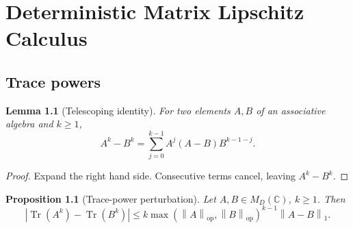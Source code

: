 \documentclass[11pt,oneside]{book}
\newtheorem{proposition}[theorem]{Proposition}
\newtheorem{lemma}[theorem]{Lemma}
\DeclareMathOperator{\Tr}{Tr}
\newcommand{\C}{\mathbb C}
\newcommand{\1}{\mathbf 1}
\newcommand{\op}{\mathrm{op}}
\newcommand{\norm}[1]{\left\|#1\right\|}
\begin{document}
\chapter{Deterministic Matrix Lipschitz Calculus}

\section{Trace powers}

\begin{lemma}[Telescoping identity]
For two elements \(A,B\) of an associative algebra and \(k\ge1\),
\[
  A^k-B^k=\sum_{j=0}^{k-1}A^j(A-B)B^{k-1-j}.
\]
\end{lemma}

\begin{proof}
Expand the right hand side.  Consecutive terms cancel, leaving \(A^k-B^k\).
\end{proof}

\begin{proposition}[Trace-power perturbation]
Let \(A,B\in M_D(\C)\), \(k\ge1\).  Then
\[
  |\Tr(A^k)-\Tr(B^k)|
  \le k\max(\norm A_{\op},\norm B_{\op})^{k-1}\norm{A-B}_1.
\]
\end{proposition}
\end{document}

